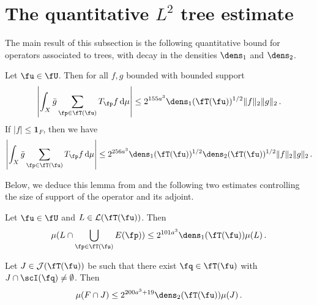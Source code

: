 \section{The quantitative \texorpdfstring{$L^2$}{L2} tree estimate}

The main result of this subsection is the following quantitative bound for operators associated to trees, with decay in the densities $\dens_1$ and $\dens_2$.

\begin{lemma}
    \label{densities-tree-bound}
    \leanok
    Let $\fu \in \fU$. Then for all $f,g$ bounded with bounded support
    \begin{equation}
        \label{eq-cor-tree-est}
        \left|\int_X \bar g \sum_{\fp \in \fT(\fu)} T_{\fp }f \, \mathrm{d}\mu \right| \le 2^{155a^3} \dens_1(\fT(\fu))^{1/2} \|f\|_2\|g\|_2\,.
    \end{equation}
    If $|f| \le \mathbf{1}_F$, then we have
    \begin{equation}
        \label{eq-cor-tree-est-F}
        \left| \int_X \bar g \sum_{\fp \in \fT(\fu)} T_{\fp }f\, \mathrm{d}\mu \right| \le 2^{256a^3} \dens_1(\fT(\fu))^{1/2} \dens_2(\fT(\fu))^{1/2} \|f\|_2\|g\|_2\,.
    \end{equation}
\end{lemma}

Below, we deduce this lemma from  and the following two estimates controlling the size of support of the operator and its adjoint.

\begin{lemma}
    \label{local-dens1-tree-bound}
    \leanok
    Let $\fu \in \fU$ and $L \in \mathcal{L}(\fT(\fu))$. Then
    \begin{equation}
    \label{eq-1density-estimate-tree}
        \mu(L \cap \bigcup_{\fp \in \fT(\fu)} E(\fp)) \le 2^{101a^3} \dens_1(\fT(\fu)) \mu(L)\,.
    \end{equation}
\end{lemma}

\begin{lemma}
    \label{local-dens2-tree-bound}
    \leanok
    Let $J \in \mathcal{J}(\fT(\fu))$ be such that there exist $\fq \in \fT(\fu)$ with $J \cap \scI(\fq) \ne \emptyset$. Then
    $$
        \mu(F \cap J) \le 2^{200a^3 + 19} \dens_2(\fT(\fu)) \mu(J)\,.
    $$
\end{lemma}

